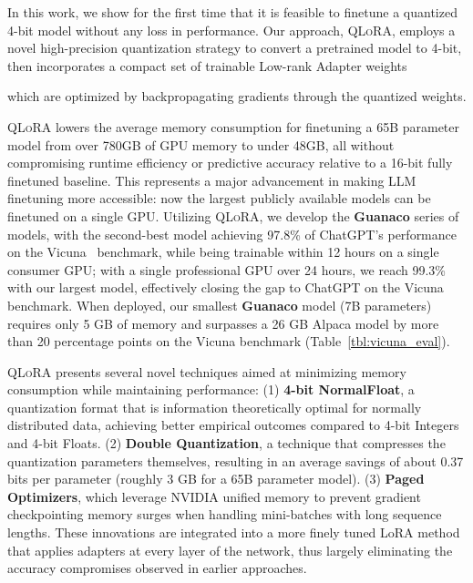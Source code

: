 In this work, we show for the first time that it is feasible to finetune a quantized 4-bit model without any loss in performance. Our approach, \textsc{QLoRA}, employs a novel high-precision quantization strategy to convert a pretrained model to 4-bit, then incorporates a compact set of trainable Low-rank Adapter weights \citep{hu2021lora} 

which are optimized by backpropagating gradients through the quantized weights.

\textsc{QLoRA} lowers the average memory consumption for finetuning a 65B parameter model from over 780GB of GPU memory to under 48GB, all without compromising runtime efficiency or predictive accuracy relative to a 16-bit fully finetuned baseline. This represents a major advancement in making LLM finetuning more accessible: now the largest publicly available models can be finetuned on a single GPU. Utilizing \textsc{QLoRA}, we develop the \textbf{Guanaco} series of models, with the second-best model achieving 97.8\% of ChatGPT’s performance on the Vicuna~\citep{vicuna2023} benchmark, while being trainable within 12 hours on a single consumer GPU; with a single professional GPU over 24 hours, we reach 99.3\% with our largest model, effectively closing the gap to ChatGPT on the Vicuna benchmark. When deployed, our smallest \textbf{Guanaco} model (7B parameters) requires only 5 GB of memory and surpasses a 26 GB Alpaca model by more than 20 percentage points on the Vicuna benchmark (Table~\ref{tbl:vicuna_eval}).

\textsc{QLoRA} presents several novel techniques aimed at minimizing memory consumption while maintaining performance: (1) \textbf{4-bit NormalFloat}, a quantization format that is information theoretically optimal for normally distributed data, achieving better empirical outcomes compared to 4-bit Integers and 4-bit Floats. (2) \textbf{Double Quantization}, a technique that compresses the quantization parameters themselves, resulting in an average savings of about 0.37 bits per parameter (roughly 3 GB for a 65B parameter model). (3) \textbf{Paged Optimizers}, which leverage NVIDIA unified memory to prevent gradient checkpointing memory surges when handling mini-batches with long sequence lengths. These innovations are integrated into a more finely tuned LoRA method that applies adapters at every layer of the network, thus largely eliminating the accuracy compromises observed in earlier approaches.


